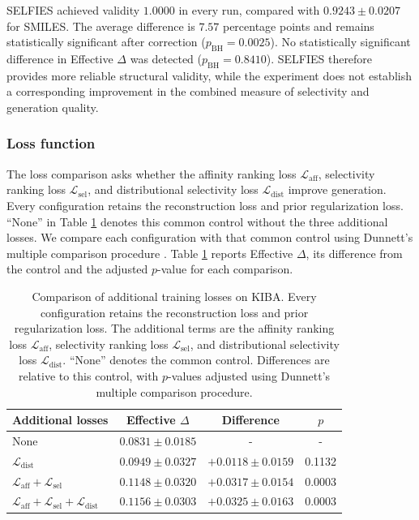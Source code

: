 \documentclass[a4paper,12pt]{article}
\begin{document}
SELFIES achieved validity $1.0000$ in every run, compared with $0.9243 \pm 0.0207$ for SMILES. The average difference is $7.57$ percentage points and remains statistically significant after correction ($p_{\mathrm{BH}}=0.0025$). No statistically significant difference in Effective $\Delta$ was detected ($p_{\mathrm{BH}}=0.8410$). SELFIES therefore provides more reliable structural validity, while the experiment does not establish a corresponding improvement in the combined measure of selectivity and generation quality.

\subsubsection{Loss function}
The loss comparison asks whether the affinity ranking loss $\mathcal{L}_{\mathrm{aff}}$, selectivity ranking loss $\mathcal{L}_{\mathrm{sel}}$, and distributional selectivity loss $\mathcal{L}_{\mathrm{dist}}$ improve generation. Every configuration retains the reconstruction loss and prior regularization loss. ``None'' in Table \ref{tab:e4_losses} denotes this common control without the three additional losses. We compare each configuration with that common control using Dunnett's multiple comparison procedure \parencite{dunnett1955multiple}. Table \ref{tab:e4_losses} reports Effective $\Delta$, its difference from the control and the adjusted $p$-value for each comparison.

\begin{table}[H]
    \centering
    \caption[Comparison of training objectives on KIBA.]{Comparison of additional training losses on KIBA. Every configuration retains the reconstruction loss and prior regularization loss. The additional terms are the affinity ranking loss $\mathcal{L}_{\mathrm{aff}}$, selectivity ranking loss $\mathcal{L}_{\mathrm{sel}}$, and distributional selectivity loss $\mathcal{L}_{\mathrm{dist}}$. ``None'' denotes the common control. Differences are relative to this control, with $p$-values adjusted using Dunnett's multiple comparison procedure.}
    \label{tab:e4_losses}
    \begin{tabular}{lccc}
        \toprule
        \textbf{Additional losses} &
        \textbf{Effective $\Delta$} &
        \textbf{Difference} &
        \textbf{$p$} \\
        \midrule
        None
        & $0.0831 \pm 0.0185$
        & -
        & - \\
        $\mathcal{L}_{\mathrm{dist}}$
        & $0.0949 \pm 0.0327$
        & $+0.0118 \pm 0.0159$
        & 0.1132 \\
        $\mathcal{L}_{\mathrm{aff}} + \mathcal{L}_{\mathrm{sel}}$
        & $0.1148 \pm 0.0320$
        & $+0.0317 \pm 0.0154$
        & 0.0003 \\
        $\mathcal{L}_{\mathrm{aff}} + \mathcal{L}_{\mathrm{sel}} + \mathcal{L}_{\mathrm{dist}}$
        & $0.1156 \pm 0.0303$
        & $+0.0325 \pm 0.0163$
        & 0.0003 \\
        \bottomrule
    \end{tabular}
\end{table}
\end{document}
